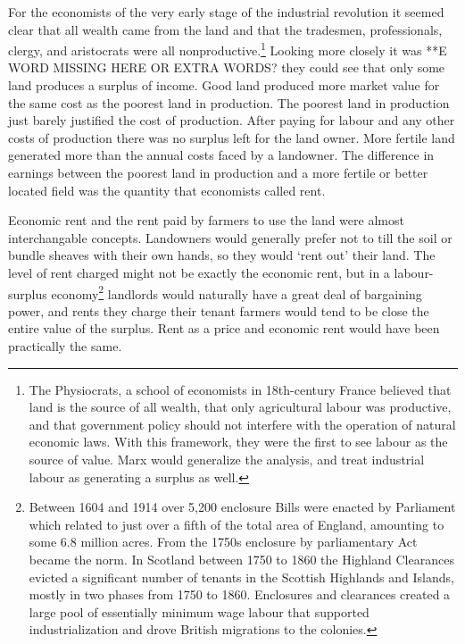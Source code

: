 For the economists of the very early stage of the industrial revolution  it seemed clear that  all wealth came from the land and that  the tradesmen, professionals, clergy, and aristocrats were all nonproductive.\footnote{The Physiocrats, a school of economists in 18th-century France believed that land is the source of all wealth, that only agricultural labour was productive, and that government policy should not interfere with the operation of natural economic laws. With this framework, they were the first to see labour as the  source of value. Marx would generalize the analysis, and treat industrial labour as generating a surplus as well.} Looking more closely it was **E WORD MISSING HERE OR EXTRA WORDS? they could see that
 only some land produces a surplus of income. Good land produced more market value for the same cost as the poorest land in production. The poorest land in production just barely justified the cost of production. After paying for labour and any other costs of production there was no surplus left for the land owner. More fertile land generated more than the annual costs faced by a landowner. The difference in earnings between the poorest land in production and a more fertile or better located field was the quantity that economists called rent. 
 
 Economic rent and the rent paid by farmers to use the land were almost interchangable concepts. Landowners would generally prefer not to till the soil or bundle sheaves with their own hands, so they would `rent out' their land. The level of rent charged might not be exactly the economic rent, but in a labour-surplus economy\footnote{Between 1604 and 1914 over 5,200 enclosure Bills were enacted by Parliament which related to just over a fifth of the total area of England, amounting to some 6.8 million acres. From the 1750s enclosure by parliamentary Act became the norm. In Scotland  between 1750 to 1860 the  Highland Clearances  evicted a significant number of tenants in the Scottish Highlands and Islands, mostly in two phases from 1750 to 1860. Enclosures and clearances created a large pool of essentially minimum wage labour that supported industrialization and drove British migrations to the colonies. } landlords would naturally have a great deal of bargaining power, and rents they charge their tenant farmers would tend to be close the entire value of the surplus. Rent as a price and economic rent would have been practically the same.

